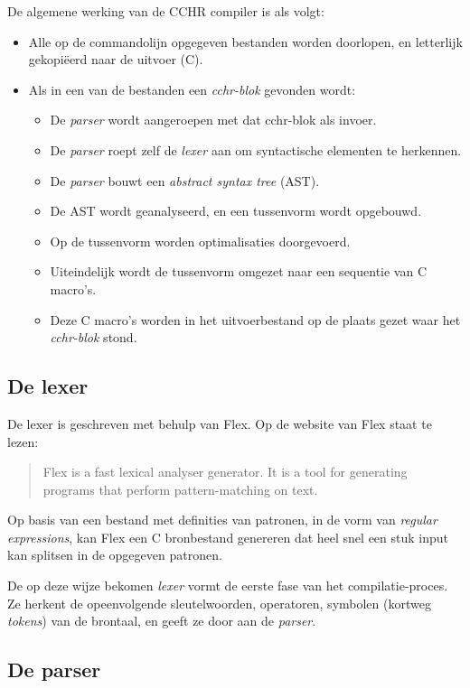 De algemene werking van de CCHR compiler is als volgt: \begin{itemize}
  \item Alle op de commandolijn opgegeven bestanden worden doorlopen, en letterlijk gekopi\"eerd naar de uitvoer (C).
  \item Als in een van de bestanden een {\em cchr-blok} gevonden wordt: \begin{itemize}
    \item De {\em parser} wordt aangeroepen met dat cchr-blok als invoer.
    \item De {\em parser} roept zelf de {\em lexer} aan om syntactische elementen te herkennen.
    \item De {\em parser} bouwt een {\em abstract syntax tree} (AST).
    \item De AST wordt geanalyseerd, en een tussenvorm wordt opgebouwd.
    \item Op de tussenvorm worden optimalisaties doorgevoerd.
    \item Uiteindelijk wordt de tussenvorm omgezet naar een sequentie van C macro's.
    \item Deze C macro's worden in het uitvoerbestand op de plaats gezet waar het {\em cchr-blok} stond.
  \end{itemize}
\end{itemize}

\subsection{De lexer} \label{sec:lexer}

De lexer is geschreven met behulp van Flex. Op de website van Flex staat te lezen: \begin{quote}
  Flex is a fast lexical analyser generator. It is a tool for generating programs that perform pattern-matching on text.
\end{quote}

Op basis van een bestand met definities van patronen, in de vorm van {\em regular expressions}, kan Flex een C bronbestand genereren dat heel snel een stuk input kan splitsen in de opgegeven patronen. 

De op deze wijze bekomen {\em lexer} vormt de eerste fase van het compilatie-proces. Ze herkent de opeenvolgende sleutelwoorden, operatoren, symbolen (kortweg {\em tokens}) van de brontaal, en geeft ze door aan de {\em parser}.

\subsection{De parser} \label{sec:parser}

